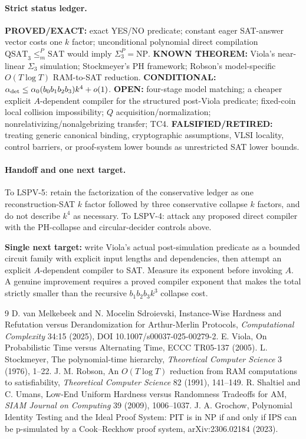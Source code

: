 \documentclass[11pt]{article}
\begin{document}
\paragraph{Strict status ledger.}
\textbf{PROVED/EXACT:} exact YES/NO predicate; constant eager SAT-answer vector costs one $k$ factor; unconditional polynomial direct compilation $\mathrm{QSAT}_3\le_m^P\mathrm{SAT}$ would imply $\Sigma_3^P=\mathrm{NP}$. 
\textbf{KNOWN THEOREM:} Viola's near-linear $\Sigma_3$ simulation; Stockmeyer's PH framework; Robson's model-specific $O(T\log T)$ RAM-to-SAT reduction. 
\textbf{CONDITIONAL:} $\alpha_{\rm det}\le\alpha_0(b_0b_1b_2b_3)k^4+o(1)$. 
\textbf{OPEN:} four-stage model matching; a cheaper explicit $A$-dependent compiler for the structured post-Viola predicate; fixed-coin local collision impossibility; $Q$ acquisition/normalization; nonrelativizing/nonalgebrizing transfer; TC4. 
\textbf{FALSIFIED/RETIRED:} treating generic canonical binding, cryptographic assumptions, VLSI locality, control barriers, or proof-system lower bounds as unrestricted SAT lower bounds.

\paragraph{Handoff and one next target.}
To LSPV-5: retain the factorization of the conservative ledger as one reconstruction-SAT $k$ factor followed by three conservative collapse $k$ factors, and do not describe $k^4$ as necessary. To LSPV-4: attack any proposed direct compiler with the PH-collapse and circular-decider controls above.

\textbf{Single next target:} write Viola's actual post-simulation predicate as a bounded circuit family with explicit input lengths and dependencies, then attempt an explicit $A$-dependent compiler to SAT. Measure its exponent before invoking $A$. A genuine improvement requires a proved compiler exponent that makes the total strictly smaller than the recursive $b_1b_2b_3k^3$ collapse cost.

\begin{thebibliography}{9}
 D. van Melkebeek and N. Mocelin Sdroievski, Instance-Wise Hardness and Refutation versus Derandomization for Arthur-Merlin Protocols, \emph{Computational Complexity} 34:15 (2025), DOI 10.1007/s00037-025-00279-2.
 E. Viola, On Probabilistic Time versus Alternating Time, ECCC TR05-137 (2005).
 L. Stockmeyer, The polynomial-time hierarchy, \emph{Theoretical Computer Science} 3 (1976), 1--22.
 J. M. Robson, An $O(T\log T)$ reduction from RAM computations to satisfiability, \emph{Theoretical Computer Science} 82 (1991), 141--149.
 R. Shaltiel and C. Umans, Low-End Uniform Hardness versus Randomness Tradeoffs for AM, \emph{SIAM Journal on Computing} 39 (2009), 1006--1037.
 J. A. Grochow, Polynomial Identity Testing and the Ideal Proof System: PIT is in NP if and only if IPS can be p-simulated by a Cook--Reckhow proof system, arXiv:2306.02184 (2023).
\end{thebibliography}
\end{document}
